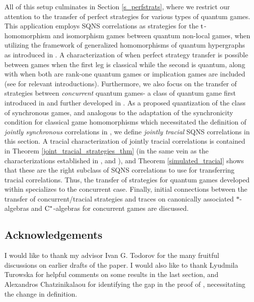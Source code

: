 \documentclass[11pt]{amsart}
\begin{document}
All of this setup culminates in Section \ref{s_perfstrats}, where we restrict our attention to the transfer of perfect strategies for various types of quantum games. This application employs SQNS correlations as strategies for the ${\rm t}$-homomorphism and isomorphism games between quantum non-local games, when utilizing the framework of generalized homomorphisms of quantum hypergraphs as introduced in \cite[Section 3]{gt_two}. A characterization of when perfect strategy transfer is possible between games when the first leg is classical while the second is quantum, along with when both are rank-one quantum games or implication games are included (see \cite{cjpp, tt} for relevant introductions). Furthermore, we also focus on the transfer of strategies between \textit{concurrent} quantum games- a class of quantum game first introduced in \cite{synch_bhtt} and further developed in \cite{bhtt, tt}. As a proposed quantization of the class of synchronous games, and analogous to the adaptation of the synchronicity condition for classical game homomorphisms which necessitated the definition of \textit{jointly synchronous} correlations in \cite[Section 8]{gt_one}, we define \textit{jointly tracial} SQNS correlations in this section. A tracial characterization of jointly tracial correlations is contained in Theorem \ref{joint_tracial_strategies_thm} (in the same vein as the characterizations established in \cite{hmps}, \cite{synch_bhtt} and \cite{bhtt}), and Theorem \ref{simulated_tracial} shows that these are the right subclass of SQNS correlations to use for transferring tracial correlations. Thus, the transfer of strategies for quantum games developed within specializes to the concurrent case. Finally, initial connections between the transfer of concurrent/tracial strategies and traces on canonically associated $*$-algebras and ${\rm C}^{*}$-algebras for concurrent games are discussed.

\subsection*{Acknowledgements}
I would like to thank my advisor Ivan G. Todorov for the many fruitful discussions on earlier drafts of the paper. I would also like to thank Lyudmila Turowska for helpful comments on some results in the last section, and Alexandros Chatzinikalaou for identifying the gap in the proof of \cite[Lemma 5.8]{gt_one}, necessitating the change in definition. 

\end{document}
